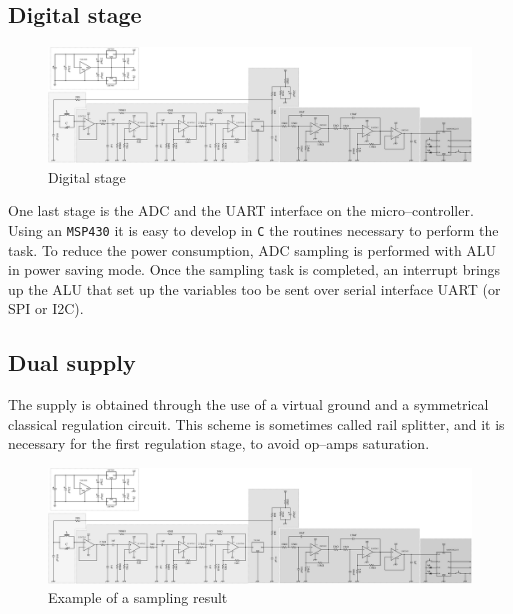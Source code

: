 \subsection{Digital stage}
\begin{figure}[h]
	\centering
	\includegraphics*[viewport=2320 3 2650 350,scale=0.4]{ch2/img/receiver3.pdf}
	\caption{Digital stage}
	\label{fig:adc}
\end{figure}
One last stage is the ADC and the UART interface on the micro--controller. Using an \texttt{MSP430} it is easy to develop in \texttt{C} the routines necessary to perform the task. To reduce the power consumption, ADC sampling is performed with ALU in power saving mode. Once the sampling task is completed, an interrupt brings up the ALU that set up the variables too be sent over serial interface UART (or SPI or I2C).

\subsection{Dual supply}
The supply is obtained through the use of a virtual ground and a symmetrical classical regulation circuit. This scheme is sometimes called rail splitter, and it is necessary for the first regulation stage, to avoid op--amps saturation.
\begin{figure}[h]
	\centering
	\includegraphics*[viewport=3 450 580 750,scale=0.4]{ch2/img/receiver3.pdf}
	\caption{Example of a sampling result}
	\label{fig:sampling_res}
	\forceversofloat
\end{figure}


